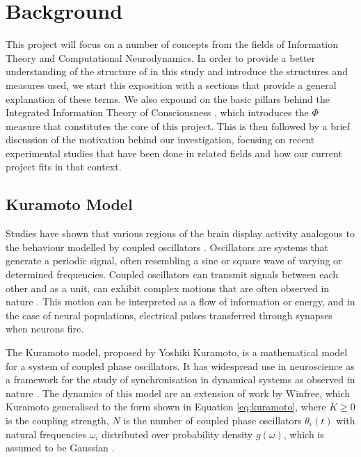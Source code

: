 \documentclass[a4paper,11pt]{article}
\begin{document}
\clearpage

\section{Background}
\label{sec:bg}
This project will focus on a number of concepts from the fields of Information Theory and Computational Neurodynamics. In order to provide a better understanding of the structure of in this study and introduce the structures and measures used, we start this exposition with a sections that provide a general explanation of these terms. We also expound on the basic pillars behind the Integrated Information Theory of Consciousness \cite{Tononi2008a}, which introduces the $\Phi$ measure that constitutes the core of this project. This is then followed by a brief discussion of the motivation behind our investigation, focusing on recent experimental studies that have been done in related fields and how our current project fits in that context.

\subsection{Kuramoto Model}
\label{KuramotoModel}
Studies have shown that various regions of the brain display activity analogous to the behaviour modelled by coupled oscillators \cite{Bennett2004}. Oscillators are systems that generate a periodic signal, often resembling a sine or square wave \cite{Westra1999} of varying or determined frequencies. Coupled oscillators can transmit signals between each other and as a unit, can exhibit complex motions that are often observed in nature \cite{Wolfs2004}. This motion can be interpreted as a flow of information or energy, and in the case of neural populations, electrical pulses transferred through synapses when neurons fire.

The Kuramoto model, proposed by Yoshiki Kuramoto, is a mathematical model for a system of coupled phase oscillators. It has widespread use in neuroscience as a framework for the study of synchronisation in dynamical systems as observed in nature \cite{Cumin2007}. The dynamics of this model are an extension of work by Winfree, which Kuramoto generalised to the form shown in Equation \ref{eq:kuramoto}, where $K \geq 0$ is the coupling strength, $N$ is the number of coupled phase oscillators $\theta_{i}(t)$ with natural frequencies $\omega_{i}$ distributed over probability density $g(\omega)$, which is assumed to be Gaussian \cite{Strogatz2000}.
\end{document}

